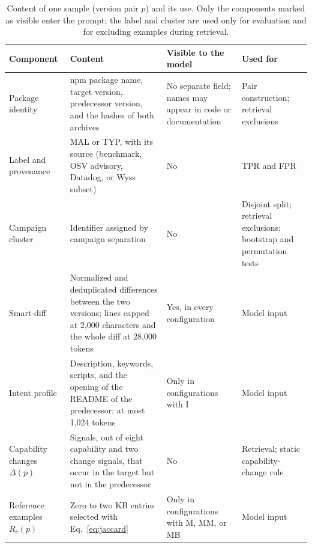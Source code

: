 \documentclass[a4paper,fleqn]{cas-dc}
\begin{document}
\begin{table}[t]
\centering\small
\caption{Content of one sample (version pair $p$) and its use. Only the
components marked as visible enter the prompt; the label and cluster are used
only for evaluation and for excluding examples during retrieval.}
\label{tab:sample}
\begin{tabularx}{\textwidth}{@{}L{2.6cm} Y L{3.3cm} L{3.5cm}@{}}
\toprule
Component & Content & Visible to the model & Used for \\
\midrule
Package identity & npm package name, target version, predecessor version,
and the hashes of both archives & No separate field; names may appear in code
or documentation & Pair construction; retrieval exclusions \\
\addlinespace
Label and provenance & MAL or TYP, with its source (benchmark, OSV advisory,
Datadog, or Wyss subset) & No & TPR and FPR \\
\addlinespace
Campaign cluster & Identifier assigned by campaign separation & No &
Disjoint split; retrieval exclusions; bootstrap and permutation tests \\
\addlinespace
Smart-diff & Normalized and deduplicated differences between the two
versions; lines capped at 2,000 characters and the whole diff at 28,000 tokens
& Yes, in every configuration & Model input \\
\addlinespace
Intent profile & Description, keywords, scripts, and the opening of the
README of the predecessor; at most 1,024 tokens & Only in configurations with
I & Model input \\
\addlinespace
Capability changes $\Delta(p)$ & Signals, out of eight capability and two
change signals, that occur in the target but not in the predecessor & No &
Retrieval; static capability-change rule \\
\addlinespace
Reference examples $R_c(p)$ & Zero to two KB entries selected with
Eq.~\eqref{eq:jaccard} & Only in configurations with M, MM, or MB &
Model input \\
\bottomrule
\end{tabularx}
\end{table}
\end{document}
